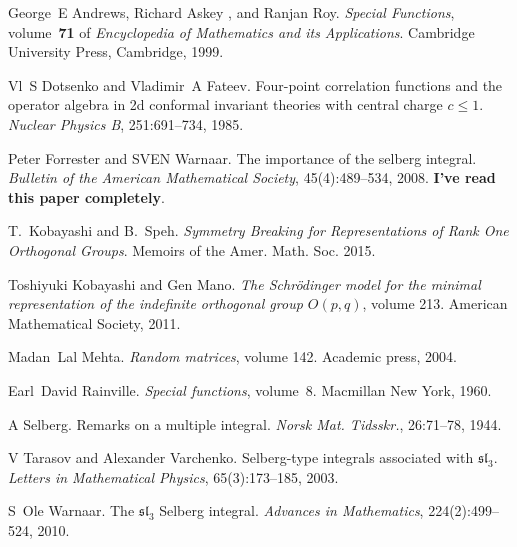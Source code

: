\documentclass{svjour3}
\newcommand{\tmtextbf}[1]{{\bfseries{#1}}}
\newcommand{\tmtextit}[1]{{\itshape{#1}}}
\begin{document}
\begin{thebibliography}{10}
  George~E Andrews, Richard Askey , and  Ranjan
  Roy.{\newblock} \tmtextit{Special Functions},  volume~\tmtextbf{71} of
  \tmtextit{Encyclopedia of Mathematics and its Applications}.{\newblock}
  Cambridge University Press, Cambridge, 1999.{\newblock}
  
  Vl~S Dotsenko  and  Vladimir~A
  Fateev.{\newblock} Four-point correlation functions and the operator algebra
  in 2d conformal invariant theories with central charge $c \leq
  1$.{\newblock} \tmtextit{Nuclear Physics B}, 251:691--734, 1985.{\newblock}
  
  Peter Forrester  and  SVEN
  Warnaar.{\newblock} The importance of the selberg integral.{\newblock}
  \tmtextit{Bulletin of the American Mathematical Society}, 45(4):489--534,
  2008.{\newblock} \tmtextbf{I've read this paper completely}.{\newblock}
  
  T.~Kobayashi  and  B.~Speh.{\newblock}
  \tmtextit{Symmetry Breaking for Representations of Rank One Orthogonal
  Groups}.{\newblock} Memoirs of the Amer. Math. Soc. 2015.{\newblock}
  
  Toshiyuki Kobayashi  and  Gen
  Mano.{\newblock} \tmtextit{The Schr{\"o}dinger model for the minimal
  representation of the indefinite orthogonal group $O (p, q)$},  volume 
  213.{\newblock} American Mathematical Society, 2011.{\newblock}
  
  Madan~Lal Mehta.{\newblock} \tmtextit{Random
  matrices},  volume  142.{\newblock} Academic press, 2004.{\newblock}
  
  Earl~David Rainville.{\newblock}
  \tmtextit{Special functions},  volume~8.{\newblock} Macmillan New York,
  1960.{\newblock}
  
  A Selberg.{\newblock} Remarks on a multiple
  integral.{\newblock} \tmtextit{Norsk Mat. Tidsskr.}, 26:71--78,
  1944.{\newblock}
  
  V Tarasov  and  Alexander
  Varchenko.{\newblock} Selberg-type integrals associated with
  $\mathfrak{sl}_3$.{\newblock} \tmtextit{Letters in Mathematical Physics},
  65(3):173--185, 2003.{\newblock}
  
  S~Ole Warnaar.{\newblock} The $\mathfrak{sl}_3$
  Selberg integral.{\newblock} \tmtextit{Advances in Mathematics},
  224(2):499--524, 2010.{\newblock}
\end{thebibliography}
\end{document}
